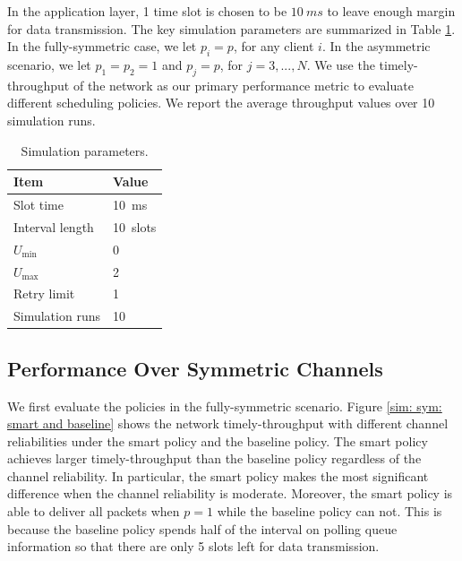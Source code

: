 \documentclass{article}
\begin{document}
In the application layer, 1 time slot is chosen to be $\SI{10}{ms}$ to leave enough margin for data transmission. The key simulation parameters are summarized in Table \ref{table: parameter}. In the fully-symmetric case, we let $p_i = p$, for any client $i$. In the asymmetric scenario, we let $p_1 = p_2 = 1$ and $p_j = p$, for $j = 3, ..., N$. We use the timely-throughput of the network as our primary performance metric to evaluate different scheduling policies. We report the average throughput values over 10 simulation runs.

\begin{table}[htbp]
\centering
    \caption{Simulation parameters.}
    \vspace{2mm}
    \begin{tabular}{ | l | l | }
    \hline
    Item & Value \\ \hline
    Slot time & \SI{10}{ms}  \\ \hline
    Interval length & \SI{10}{slots} \\ \hline
    $U_{\min}$ & 0 \\ \hline
    $U_{\max}$ & 2 \\ \hline
    Retry limit & 1 \\ \hline
    Simulation runs & 10 \\
    \hline
\end{tabular}
\label{table: parameter}
\end{table}


\subsection{Performance Over Symmetric Channels}
We first evaluate the policies in the fully-symmetric scenario. Figure \ref{sim: sym: smart and baseline} shows the network timely-throughput with different channel reliabilities under the smart policy and the baseline policy. The smart policy achieves larger timely-throughput than the baseline policy regardless of the channel reliability. In particular, the smart policy makes the most significant difference when the channel reliability is moderate. Moreover, the smart policy is able to deliver all packets when $p=1$ while the baseline policy can not. This is because the baseline policy spends half of the interval on polling queue information so that there are only 5 slots left for data transmission.
\end{document}
